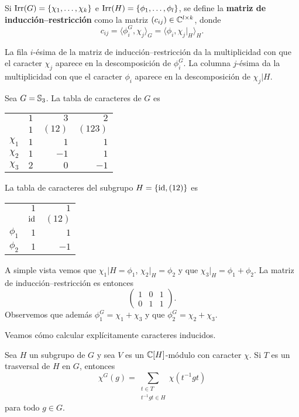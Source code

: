 \begin{definition}
Si $\operatorname{Irr}(G)=\{\chi_1,\dots,\chi_k\}$ e $\operatorname{Irr}(H)=\{\phi_1,\dots,\phi_l\}$, se define
la \textbf{matriz de inducción--restricción} como la matriz $(c_{ij})\in\mathbb{C}^{l\times k}$, donde
\[
c_{ij}=\langle \phi_i^G,\chi_j\rangle_G=\langle\phi_i,\chi_j|_H\rangle_H.
\]
\end{definition}

La fila $i$-ésima de la matriz de inducción--restricción da la multiplicidad con que el caracter $\chi_j$ aparece
en la descomposición de $\phi_i^G$. La columna $j$-ésima da la multiplicidad con que el caracter $\phi_i$ aparece 
en la descomposición de $\chi_j|H$.

\begin{example}
Sea $G=\mathbb{S}_3$. 
La tabla de caracteres de $G$ es 
	\begin{center}
		\begin{tabular}{|c|rrr|}
			\hline
			& $1$ & $3$ & $2$\tabularnewline
			& $1$ & $(12)$ & $(123)$ \tabularnewline
			\hline 
			$\chi_{1}$ & $1$ & $1$ & $1$\tabularnewline
			$\chi_{2}$ & $1$ & $-1$ & $1$ \tabularnewline
			$\chi_{3}$ & $2$ & $0$ & $-1$ \tabularnewline
			\hline
		\end{tabular}
	\end{center}
La tabla de caracteres del subgrupo 
$H=\{\operatorname{id},(12)\}$ es 
\begin{center}
\begin{tabular}{|c|rr|}
\hline 
& $1$ & $1$ \tabularnewline
& $\operatorname{id}$ & $(12)$ \tabularnewline
\hline 
$\phi_{1}$ & $1$ & $1$ \tabularnewline
$\phi_{2}$ & $1$ & $-1$\tabularnewline
\hline
\end{tabular}
\end{center}
A simple vista vemos que $\chi_1|H=\phi_1$, $\chi_2|_H=\phi_2$ y que $\chi_3|_H=\phi_1+\phi_2$. 
La matriz de inducción--restricción es entonces
\[
\begin{pmatrix}
1 & 0 & 1\\
0 & 1 & 1
\end{pmatrix}.
\]
Observemos que además $\phi_1^G=\chi_1+\chi_3$ y que $\phi_2^G=\chi_2+\chi_3$. 
\end{example}

Veamos cómo calcular explícitamente caracteres inducidos. 

\begin{proposition}
Sea $H$ un subgrupo de $G$ y sea $V$ es un $\mathbb{C}[H]$-módulo con caracter $\chi$. Si 
$T$ es un trasversal de $H$ en $G$, entonces
\[
\chi^G(g)=\sum_{\substack{t\in T\\t^{-1}gt\in H}}\chi(t^{-1}gt)
\]
para todo $g\in G$. 
\end{proposition}

